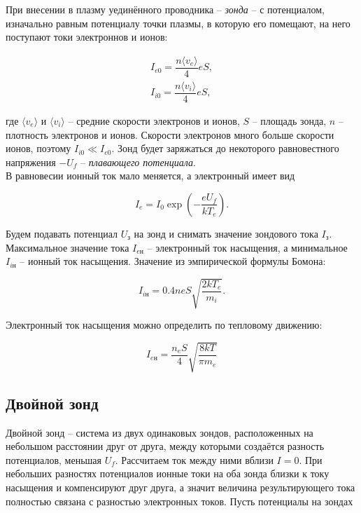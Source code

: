 \documentclass[a4paper,12pt]{article}
\begin{document}
При внесении в плазму уединённого проводника -- \textit{зонда} -- с потенциалом, изначально равным потенциалу точки плазмы, в которую его помещают, на него поступают токи электроннов и ионов:

\begin{equation}
    \begin{array}{c}
        I_{e0} = \dfrac{n \langle v_e \rangle}{4}eS,\\
        I_{i0} = \dfrac{n \langle v_i \rangle}{4}eS,
    \end{array}
\end{equation}

где $\langle v_e \rangle$ и $\langle v_i \rangle$ -- средние скорости электронов и ионов, $S$ -- площадь зонда, $n$ -- плотность электронов и ионов. Скорости электронов много больше скорости ионов, поэтому $I_{i0} \ll I_{e0}$. Зонд будет заряжаться до некоторого равновестного напряжения $-U_f$ -- \textit{плавающего потенциала}.\\
В равновесии ионный ток мало меняется, а электронный имеет вид

\begin{equation*}
    I_e = I_0 \exp\left( -\dfrac{eU_f}{kT_e} \right).
\end{equation*}


Будем подавать потенциал $U_\text{з}$ на зонд и снимать значение зондового тока $I_\text{з}$. Максимальное значение тока $I_{e\text{н}}$ -- электронный ток насыщения, а минимальное $I_{i\text{н}}$ -- ионный ток насыщения. Значение из эмпирической формулы Бомона:

\begin{equation}
    I_{i\text{н}} = 0.4 neS \sqrt{\dfrac{2kT_e}{m_i}}.
\end{equation}
	
Электронный ток насыщения можно определить по тепловому движению:

\begin{equation*}
    I_{e\text{н}} = \frac{n_eS}{4}\sqrt{\frac{8kT}{\pi m_e}}  
\end{equation*}

\subsection*{Двойной зонд}

Двойной зонд -- система из двух одинаковых зондов, расположенных на небольшом расстоянии друг от друга, между которыми создаётся разность потенциалов, меньшая $U_f$. Рассчитаем ток между ними вблизи $I=0$. При небольших разностях потенциалов ионные токи на оба зонда близки к току насыщения и компенсируют друг друга, а значит величина результирующего тока полностью связана с разностью электронных токов. Пусть потенциалы на зондах
\end{document}
